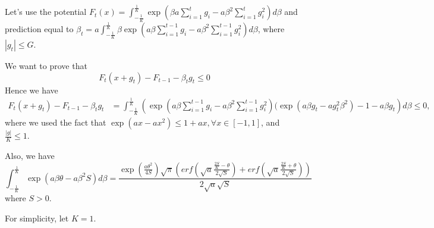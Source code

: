 \documentclass{colt2016_empty} %
\begin{document}
Let's use the potential $F_t(x)=\int_{-\tfrac{1}{K}}^{\tfrac{1}{K}} \exp(\beta a \sum_{i=1}^t g_i - a \beta^2 \sum_{i=1}^t g_i^2) d\beta$ and prediction equal to $\beta_{t}=a \int_{-\tfrac{1}{K}}^{\tfrac{1}{K}} \beta \exp(a \beta \sum_{i=1}^{t-1} g_i - a \beta^2 \sum_{i=1}^{t-1} g_i^2) d\beta$, where $|g_t|\leq G$.

We want to prove that
\[
F_t(x+g_t) - F_{t-1} -\beta_t g_t \leq 0
\]
Hence we have
\begin{align}
F_t(x+g_t) - F_{t-1} -\beta_t g_t 
&=\int_{-\tfrac{1}{K}}^{\tfrac{1}{K}} \left(\exp(a \beta \sum_{i=1}^{t-1} g_i - a \beta^2 \sum_{i=1}^{t-1} g_i^2)(\exp(a \beta g_t-a g_t^2 \beta^2) -1 - a \beta g_t\right) d\beta \leq 0,
\end{align}
where we used the fact that $\exp(a x-a x^2)\leq 1+ a x, \forall x\in[-1,1]$, and $\frac{|g|}{K}\leq 1$.

Also, we have
\[
\int_{-\tfrac{1}{K}}^{\tfrac{1}{K}} \exp(a \beta \theta - a \beta^2 S) d\beta 
= \frac{\exp(\frac{a \theta^2}{4 S}) \sqrt{\pi} (erf(\sqrt{a}\frac{\frac{2 S}{K}-\theta}{2 \sqrt{S}})+erf(\sqrt{a}\frac{\frac{2 S}{K}+\theta}{2 \sqrt{S}}))}{2 \sqrt{a} \sqrt{S}}
\]
where $S>0$.

For simplicity, let $K=1$.
\end{document}
